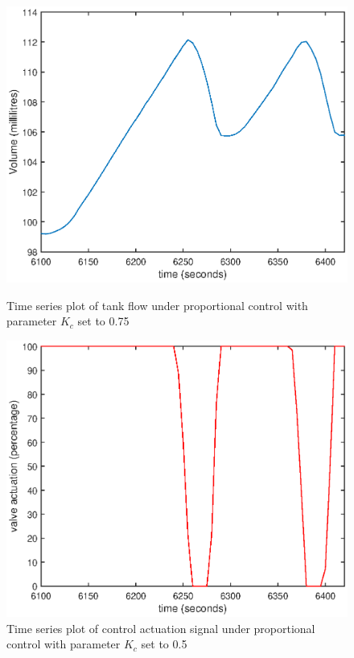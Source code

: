 \documentclass{article}
\begin{document}
\begin{figure}[h]
	\centering
	\begin{minipage}{0.45\textwidth}
		\centering
		\includegraphics[scale=0.4]{P_Kc_075}
		\caption{Time series plot of tank flow under proportional control with parameter $K_c$ set to 0.75}
	\end{minipage}
	\hspace{0.5cm}
	\begin{minipage}{0.45\textwidth}
		\centering
		\includegraphics[scale=0.4]{P_Kc_075_control}
		\caption{Time series plot of control actuation signal under proportional control with parameter $K_c$ set to 0.5}
	\end{minipage}
\end{figure}
\end{document}
